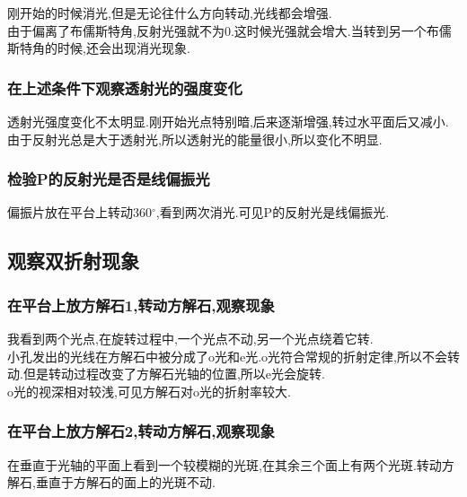 \documentclass[a4paper,10pt,notitlepage]{article}
\begin{document}
	刚开始的时候消光,但是无论往什么方向转动,光线都会增强. \\
	
	由于偏离了布儒斯特角,反射光强就不为0.这时候光强就会增大.当转到另一个布儒斯特角的时候,还会出现消光现象. \\
	
\subsubsection{在上述条件下观察透射光的强度变化}

	透射光强度变化不太明显.刚开始光点特别暗,后来逐渐增强,转过水平面后又减小. \\
	
	由于反射光总是大于透射光,所以透射光的能量很小,所以变化不明显. \\
	
\subsubsection{检验P的反射光是否是线偏振光}

	偏振片放在平台上转动360$^{\circ}$,看到两次消光.可见P的反射光是线偏振光. \\
	
\subsection{观察双折射现象}

\subsubsection{在平台上放方解石1,转动方解石,观察现象}

	我看到两个光点,在旋转过程中,一个光点不动,另一个光点绕着它转. \\
	
	小孔发出的光线在方解石中被分成了o光和e光.o光符合常规的折射定律,所以不会转动.但是转动过程改变了方解石光轴的位置,所以e光会旋转. \\
	
	o光的视深相对较浅,可见方解石对o光的折射率较大. \\
	
\subsubsection{在平台上放方解石2,转动方解石,观察现象}

	在垂直于光轴的平面上看到一个较模糊的光斑,在其余三个面上有两个光斑.转动方解石,垂直于方解石的面上的光斑不动. \\
	
\end{document}

